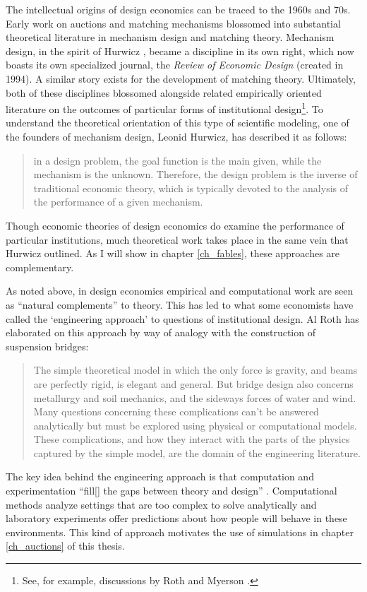 The intellectual origins of design economics can be traced to the 1960s and 70s. Early work on auctions \autocite{vickrey1961} and matching mechanisms \autocite{gale1962} blossomed into substantial theoretical literature in mechanism design and matching theory. Mechanism design, in the spirit of Hurwicz \autocite*{hurwicz1972}, became a discipline in its own right, which now boasts its own specialized journal, the \textit{Review of Economic Design} (created in 1994). A similar story exists for the development of matching theory. Ultimately, both of these disciplines blossomed alongside related empirically oriented literature on the outcomes of particular forms of institutional design\footnote{See, for example, discussions by Roth \autocite*{roth2002} and Myerson \autocite*{myerson2008}.}. To understand the theoretical orientation of this type of scientific modeling, one of the founders of mechanism design, Leonid Hurwicz, has described it as follows:
\begin{quote}
	in a design problem, the goal function is the main given, while the mechanism is the unknown. Therefore, the design problem is the inverse of traditional economic theory, which is typically devoted to the analysis of the performance of a given mechanism. \autocite[30]{hurwicz2006designing}
\end{quote}
\noindent Though economic theories of design economics do examine the performance of particular institutions, much theoretical work takes place in the same vein that Hurwicz outlined. As I will show in chapter \ref{ch_fables}, these approaches are complementary.

As noted above, in design economics empirical and computational work are seen as ``natural complements'' \autocite[1363]{roth2002} to theory. This has led to what some economists have called the `engineering approach' to questions of institutional design. Al Roth has elaborated on this approach by way of analogy with the construction of suspension bridges:
\begin{quote}
	The simple theoretical model in which the only force is gravity, and beams are perfectly rigid, is elegant and general. But bridge design also concerns metallurgy and soil mechanics, and the sideways forces of water and wind. Many questions concerning these complications can’t be answered analytically but must be explored using physical or computational models. These complications, and how they interact with the parts of the physics captured by the simple model, are the domain of the engineering literature. \autocite[1342]{roth2002}
\end{quote}
\noindent The key idea behind the engineering approach is that computation and experimentation ``fill[] the gaps between theory and design'' \autocite[p1374]{roth2002}. Computational methods analyze settings that are too complex to solve analytically and laboratory experiments offer predictions about how people will behave in these environments. This kind of approach motivates the use of simulations in chapter \ref{ch_auctions} of this thesis.

